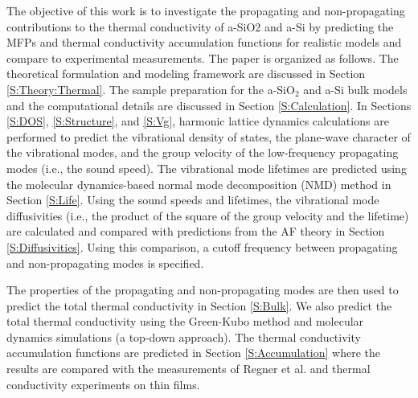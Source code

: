 The objective of this work is to investigate the propagating 
and non-propagating contributions to the thermal conductivity 
of a-SiO2 and a-Si   
by predicting the MFPs and thermal conductivity 
accumulation functions for realistic models and compare to 
experimental measurements.
\cite{freeman_thermal_1986,graebner_phonon_1986,
cahill_lattice_1988,cahill_thermal_1989,
love_estimate_1990,cahill_thermal_1994,lee_heat_1997,
yamane_measurement_2002,baldi_thermal_2008,
liu_high_2009,yang_anomalously_2010,regner_broadband_2013} 
The paper is organized as follows. 
The theoretical formulation and modeling framework are 
discussed in Section \ref{S:Theory:Thermal}. The sample preparation 
for the a-SiO$_2$ and a-Si bulk models and the computational details 
are discussed in Section \ref{S:Calculation}. 
In Sections \ref{S:DOS}, \ref{S:Structure}, and \ref{S:Vg}, 
harmonic lattice dynamics calculations 
are performed to predict the vibrational density of 
states, the plane-wave character of the vibrational modes, and  
the group velocity of the low-frequency propagating modes (i.e., 
the sound speed). 
The vibrational mode lifetimes are predicted using the
molecular dynamics-based normal 
mode decomposition (NMD) method in Section \ref{S:Life}. 
Using the sound speeds and lifetimes, the vibrational 
mode diffusivities (i.e., the product of the square of 
the group velocity and the lifetime) are calculated and compared 
with predictions from the AF theory in Section \ref{S:Diffusivities}. 
Using this comparison, a cutoff frequency between propagating and 
non-propagating modes is specified.

The properties of the propagating and non-propagating 
modes are then used to predict the total thermal 
conductivity in Section \ref{S:Bulk}. We also predict the total 
thermal conductivity using the Green-Kubo method 
and molecular dynamics simulations (a top-down approach). 
The thermal conductivity accumulation functions 
are predicted in Section \ref{S:Accumulation} 
where the results are compared with the measurements of  
Regner et al.\cite{regner_broadband_2013} and thermal conductivity 
experiments on thin films.\cite{freeman_thermal_1986,
graebner_phonon_1986,cahill_lattice_1988,cahill_thermal_1989,
love_estimate_1990,cahill_thermal_1994,lee_heat_1997,
yamane_measurement_2002,baldi_thermal_2008,
liu_high_2009,yang_anomalously_2010} 


